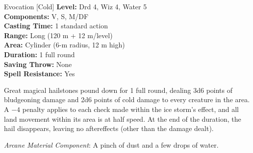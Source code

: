 {Evocation [Cold]}
{
	\textbf{Level:}
	Drd 4, Wiz 4, Water 5\\
	\textbf{Components:}
	V, S, M/DF\\
	\textbf{Casting Time:}
	1 standard action\\
	\textbf{Range:}
	Long (120 m + 12 m/level)\\
	\textbf{Area:}
	Cylinder (6-m radius, 12 m high)\\
	\textbf{Duration:}
	1 full round\\
	\textbf{Saving Throw:}
	None\\
	\textbf{Spell Resistance:}
	Yes\\
}
{
	Great magical hailstones pound down for 1 full round, dealing 3d6 points of bludgeoning damage and 2d6 points of cold damage to every creature in the area. A $-4$ penalty applies to each  check made within the ice storm's effect, and all land movement within its area is at half speed. At the end of the duration, the hail disappears, leaving no aftereffects (other than the damage dealt).

	\textit{Arcane Material Component}:
	A pinch of dust and a few drops of water.

}
